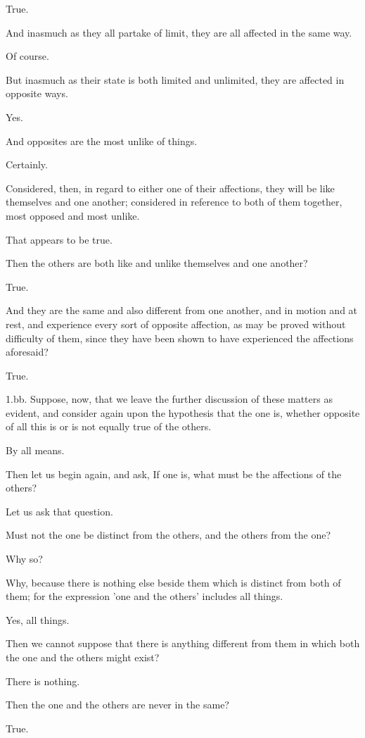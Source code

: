 True.

And inasmuch as they all partake of limit, they are all affected in the
same way.

Of course.

But inasmuch as their state is both limited and unlimited, they are
affected in opposite ways.

Yes.

And opposites are the most unlike of things.

Certainly.

Considered, then, in regard to either one of their affections, they will
be like themselves and one another; considered in reference to both of
them together, most opposed and most unlike.

That appears to be true.

Then the others are both like and unlike themselves and one another?

True.

And they are the same and also different from one another, and in motion
and at rest, and experience every sort of opposite affection, as may be
proved without difficulty of them, since they have been shown to have
experienced the affections aforesaid?

True.

1.bb. Suppose, now, that we leave the further discussion of these
matters as evident, and consider again upon the hypothesis that the
one is, whether opposite of all this is or is not equally true of the
others.

By all means.

Then let us begin again, and ask, If one is, what must be the affections
of the others?

Let us ask that question.

Must not the one be distinct from the others, and the others from the
one?

Why so?

Why, because there is nothing else beside them which is distinct from
both of them; for the expression 'one and the others' includes all
things.

Yes, all things.

Then we cannot suppose that there is anything different from them in
which both the one and the others might exist?

There is nothing.

Then the one and the others are never in the same?

True.

